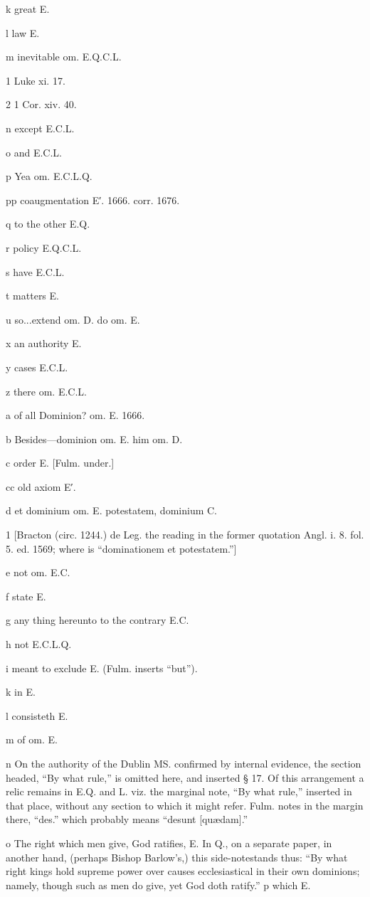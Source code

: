 k
great E.

l
law E.

m
inevitable om. E.Q.C.L.

1
Luke xi. 17.

2
1 Cor. xiv. 40.

n
except E.C.L.

o
and E.C.L.

p
Yea om. E.C.L.Q.

pp
coaugmentation E′. 1666. corr. 1676.

q
to the other E.Q.

r
policy E.Q.C.L.

s
have E.C.L.

t
matters E.

u
so...extend om. D. do om. E.

x
an authority E.

y
cases E.C.L.

z
there om. E.C.L.

a
of all Dominion? om. E. 1666.

b
Besides—dominion om. E. him om. D.

c
order E. [Fulm. under.]

cc
old axiom E′.

d
et dominium om. E. potestatem, dominium C.

1
[Bracton (circ. 1244.) de Leg. the reading in the former quotation Angl. i. 8. fol. 5. ed. 1569; where is “dominationem et potestatem.”]

e
not om. E.C.

f
state E.

g
any thing hereunto to the contrary E.C.

h
not E.C.L.Q.

i
meant to exclude E. (Fulm. inserts “but”).

k
in E.

l
consisteth E.

m
of om. E.

n
On the authority of the Dublin MS. confirmed by internal evidence, the section headed, “By what rule,” is omitted here, and inserted § 17. Of this arrangement a relic remains in E.Q. and L. viz. the marginal note, “By what rule,” inserted in that place, without any section to which it might refer. Fulm. notes in the margin there, “des.” which probably means “desunt [quædam].”

o The right which men give, God ratifies, E. In Q., on a separate paper, in another hand, (perhaps Bishop Barlow’s,) this side-notestands thus: “By what right kings hold supreme power over causes ecclesiastical in their own dominions; namely, though such as men do give, yet God doth ratify.”
p
which E.

